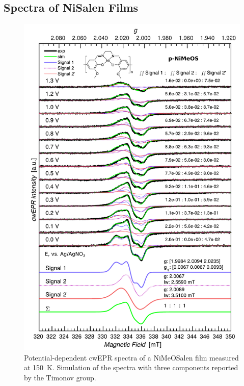 \subsection{Spectra of NiSalen Films}
\begin{figure}[h]
\center
	\includegraphics[width=1\textwidth]{./operando_epr/figures/CRYO/Figure_S8.pdf}
	\caption{Potential-dependent cwEPR spectra of a NiMeOSalen film measured at 150~K. Simulation of the spectra with three components reported by the Timonov group.}
	\label{fig:cwEPR_CRYO_NiSalen_REDOX_SIM}
\end{figure}

